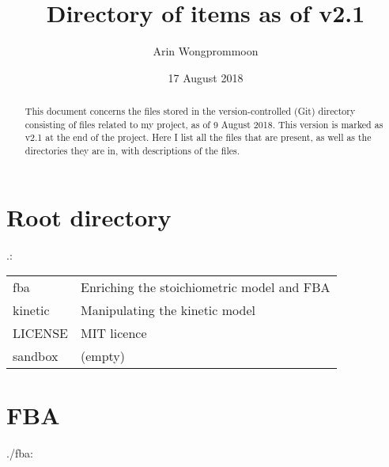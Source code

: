 \documentclass[a4paper, parskip=full]{scrreprt}
\author{Arin Wongprommoon}
\title{Directory of items as of v2.1}
\date{17 August 2018}
\begin{document}
\maketitle

\tableofcontents

\begin{abstract}
  This document concerns the files stored in the version-controlled (Git) directory consisting of files related to my project, as of 9 August 2018. This version is marked as v2.1 at the end of the project. Here I list all the files that are present, as well as the directories they are in, with descriptions of the files.
  \end{abstract}

\setlength{\LTleft}{0pt}

\chapter{Root directory}
\label{ch:root}
.:

\begin{tabularx}{\linewidth}{LL}
fba & Enriching the stoichiometric model and FBA\\
kinetic & Manipulating the kinetic model\\
LICENSE & MIT licence\\
sandbox & (empty)
\end{tabularx}

\chapter{FBA}
\label{ch:fba}
./fba:
\end{document}
